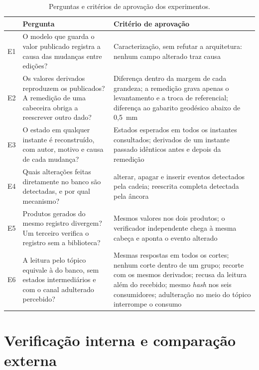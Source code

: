 \begin{table}[htbp]
    \centering
    \caption{Perguntas e critérios de aprovação dos experimentos.}
    \label{tab:experimentos}
    \small
    \begin{tabularx}{\linewidth}{l X X}
        \toprule
        & Pergunta & Critério de aprovação \\
        \midrule
        E1 & O modelo que guarda o valor publicado registra a causa das mudanças entre edições? & Caracterização, sem refutar a arquitetura: nenhum campo alterado traz causa \\
        E2 & Os valores derivados reproduzem os publicados? A remedição de uma cabeceira obriga a reescrever outro dado? & Diferença dentro da margem de cada grandeza; a remedição grava apenas o levantamento e a troca de referencial; diferença ao gabarito geodésico abaixo de 0,5~mm \\
        E3 & O estado em qualquer instante é reconstruído, com autor, motivo e causa de cada mudança? & Estados esperados em todos os instantes consultados; derivados de um instante passado idênticos antes e depois da remedição \\
        E4 & Quais alterações feitas diretamente no banco são detectadas, e por qual mecanismo? & alterar, apagar e inserir eventos detectados pela cadeia; reescrita completa detectada pela âncora \\
        E5 & Produtos gerados do mesmo registro divergem? Um terceiro verifica o registro sem a biblioteca? & Mesmos valores nos dois produtos; o verificador independente chega à mesma cabeça e aponta o evento alterado \\
        E6 & A leitura pelo tópico equivale à do banco, sem estados intermediários e com o canal adulterado percebido? & Mesmas respostas em todos os cortes; nenhum corte dentro de um grupo; recorte com os mesmos derivados; recusa da leitura além do recebido; mesmo \textit{hash} nos seis consumidores; adulteração no meio do tópico interrompe o consumo \\
        \bottomrule
    \end{tabularx}
    \par{}
\end{table}


\section{Verificação interna e comparação externa}\label{sec:validacao}

